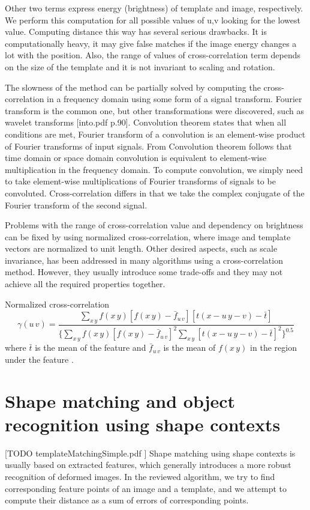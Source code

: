 Other two terms express energy (brightness) of template and image, respectively. We perform this computation for all possible values of u,v looking for the lowest value. Computing distance this way has several serious drawbacks. It is computationally heavy, it may give false matches if the image energy changes a lot with the position. Also, the range of values of cross-correlation term depends on the size of the template and it is not invariant to scaling and rotation. 

The slowness of the method can be partially solved by computing the cross-correlation in a frequency domain using some form of a signal transform. Fourier transform is the common one, but other transformations were discovered, such as wavelet transforms [into.pdf p.90]. Convolution theorem states that when all conditions are met, Fourier transform of a convolution is an element-wise product of Fourier transforms of input signals. From Convolution theorem follows that time domain or space domain convolution is equivalent to element-wise multiplication in the frequency domain. To compute convolution, we simply need to take element-wise multiplications of Fourier transforms of signals to be convoluted. Cross-correlation differs in that we take the complex conjugate of the Fourier transform of the second signal.

Problems with the range of cross-correlation value and dependency on brightness can be fixed by using normalized cross-correlation, where image and template vectors are normalized to unit length. Other desired aspects, such as scale invariance, has been addressed in many algorithms using a cross-correlation method. However, they usually introduce some trade-offs and they may not achieve all the required properties together. 

Normalized cross-correlation
\begin{equation*}
\gamma(u\,v) = \frac{\sum_{x\,y}f(x\,y) [f(x\,y)-\bar{f}_{u\,v}][t(x-u\,y-v)-\bar{t}]} {\{ \sum_{x\,y}f(x\,y) [f(x\,y)-\bar{f}_{u\,v}]^2 \sum_{x\,y}[t(x-u\,y-v)-\bar{t}]^2  \}^{0.5}}
\end{equation*}
where $\bar{t}$ is the mean of the feature and $\bar{f}_{u\,v}$ is the mean of $f(x\,y)$ in the region under the feature \cite{crossCorrLewis}.

\section{Shape matching and object recognition using shape contexts}
[TODO templateMatchingSimple.pdf ]
Shape matching using shape contexts is usually based on extracted features, which generally introduces a more robust recognition of deformed images. In the reviewed algorithm, we try to find corresponding feature points of an image and a template, and we attempt to compute their distance as a sum of errors of corresponding points.


